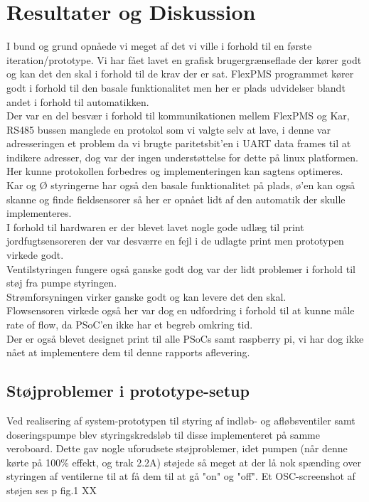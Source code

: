 \section{Resultater og Diskussion}
I bund og grund opnåede vi meget af det vi ville i forhold til en første iteration/prototype. Vi har fået lavet en grafisk brugergrænseflade der kører godt og kan det den skal i forhold til de krav der er sat. FlexPMS programmet kører godt i forhold til den basale funktionalitet men her er plads udvidelser blandt andet i forhold til automatikken.\\
Der var en del besvær i forhold til kommunikationen mellem FlexPMS og Kar, RS485 bussen manglede en protokol som vi valgte selv at lave, i denne var adresseringen et problem da vi brugte paritetsbit'en i UART data frames til at indikere adresser, dog var der ingen understøttelse for dette på linux platformen. Her kunne protokollen forbedres og implementeringen kan sagtens optimeres. \\
Kar og Ø styringerne har også den basale funktionalitet på plads, ø'en kan også skanne og finde fieldsensorer så her er opnået lidt af den automatik der skulle implementeres.\\
I forhold til hardwaren er der blevet lavet nogle gode udlæg til print jordfugtsensoreren der var desværre en fejl i de udlagte print men prototypen virkede godt. \\
Ventilstyringen fungere også ganske godt dog var der lidt problemer i forhold til støj fra pumpe styringen.\\
Strømforsyningen virker ganske godt og kan levere det den skal. \\
Flowsensoren virkede også her var dog en udfordring i forhold til at kunne måle rate of flow, da PSoC'en ikke har et begreb omkring tid. \\
Der er også blevet designet print til alle PSoCs samt raspberry pi, vi har dog ikke nået at implementere dem til denne rapports aflevering.
   

\subsection{Støjproblemer i prototype-setup}

Ved realisering af system-prototypen til styring af indløb- og afløbsventiler samt doseringspumpe blev styringskredsløb til disse implementeret på samme veroboard. 
Dette gav nogle uforudsete støjproblemer, idet pumpen (når denne kørte på 100\% effekt, og trak 2.2A) støjede så meget at der lå nok spænding over styringen af ventilerne til at få dem til at gå "on" og "off".
Et OSC-screenshot af støjen ses p fig.1 XX\\

